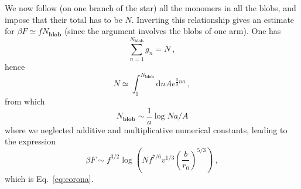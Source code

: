 \documentclass[
preprint,
a4paper,
12pt,
superscriptaddress,
pre]{revtex4}
\begin{document}
We now follow (on one branch of the star) all the monomers in all the
blobs, and impose that their total has to be $N$. Inverting this
relationship gives an estimate for $ \beta F \simeq f
N_{\mathbf{blob}}$ (since the argument involves the blobs of one
arm). One has
\begin{displaymath}
  \sum_{n=1}^{N_{\mathbf{blob}}} g_n = N \ ,
\end{displaymath}
hence
\begin{displaymath}
  N \simeq \int_{1}^{N_{\mathbf{blob}}} \mathrm{d}n  A e^{\frac{5}{3}n
    a} \ , 
\end{displaymath}
from which
\begin{displaymath}
  N_{\mathbf{blob}} \sim \frac{1}{a} \log N a / A
\end{displaymath}
where we neglected additive and multiplicative numerical constants,
leading to the expression
\begin{displaymath}
  \beta F \sim f^{3/2} \log 
  \left(  N f^{7/6} v^{1/3}  \left(\frac{b}{r_0} \right)^{5/3} \right) \ ,
\end{displaymath}
which is Eq.~\eqref{eq:corona}.



\end{document}
